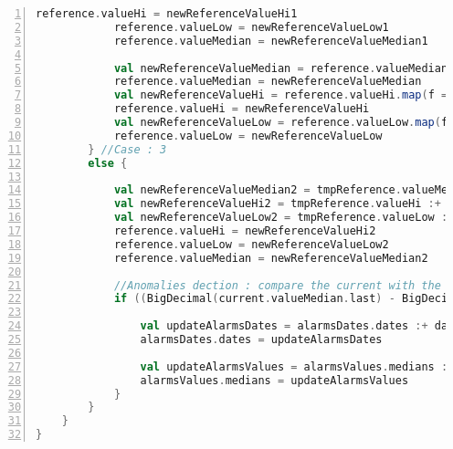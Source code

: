 \begin{lstlisting}[language=scala,firstnumber=1, caption={Définition de la classe ResumedLink},label={lst:findAlarmsFunction}, basicstyle = \footnotesize,escapechar=|,numbers=left,
stepnumber=1]
			reference.valueHi = newReferenceValueHi1
			reference.valueLow = newReferenceValueLow1
			reference.valueMedian = newReferenceValueMedian1
			
			val newReferenceValueMedian = reference.valueMedian.map(f => reference.valueMedian.last)
			reference.valueMedian = newReferenceValueMedian
			val newReferenceValueHi = reference.valueHi.map(f => reference.valueHi.last)
			reference.valueHi = newReferenceValueHi
			val newReferenceValueLow = reference.valueLow.map(f => reference.valueLow.last)
			reference.valueLow = newReferenceValueLow
		} //Case : 3
		else {
			
			val newReferenceValueMedian2 = tmpReference.valueMedian :+ (0.99 * tmpReference.valueMedian.last + 0.01 * current.valueMedian.last)
			val newReferenceValueHi2 = tmpReference.valueHi :+ (0.99 * tmpReference.valueHi.last + 0.01 * newDist(javatools.JavaTools.getIntegerPart(wilsonCi(1))))
			val newReferenceValueLow2 = tmpReference.valueLow :+ (0.99 * tmpReference.valueLow.last + 0.01 * newDist(javatools.JavaTools.getIntegerPart(wilsonCi(0))))
			reference.valueHi = newReferenceValueHi2
			reference.valueLow = newReferenceValueLow2
			reference.valueMedian = newReferenceValueMedian2
			
			//Anomalies dection : compare the current with the reference
			if ((BigDecimal(current.valueMedian.last) - BigDecimal(current.valueLow.last) > reference.valueHi.last || current.valueMedian.last + current.valueHi.last < reference.valueLow.last) && scala.math.abs(current.valueMedian.last - reference.valueMedian.last) > 1) {
				
				val updateAlarmsDates = alarmsDates.dates :+ date
				alarmsDates.dates = updateAlarmsDates
				
				val updateAlarmsValues = alarmsValues.medians :+ current.valueMedian.last
				alarmsValues.medians = updateAlarmsValues
			}
		}
	}
}
\end{lstlisting}
